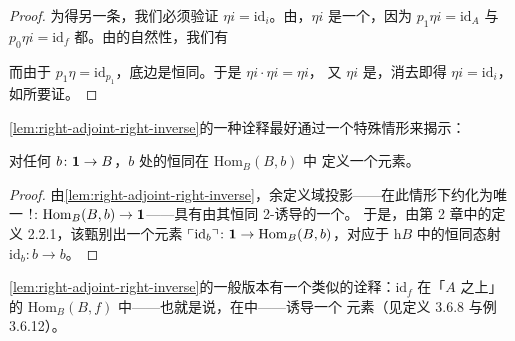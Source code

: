 \begin{proof}
为得另一条，我们必须验证 $\eta i=\mathrm{id}_i$。由\trTwoCellConservativity{}，$\eta i$ %
是一个\trIsomorphism{}，因为 $p_{1}\eta i=\mathrm{id}_A$ 与 $p_{0}\eta i=\mathrm{id}_f$ %
都\trInvertible{}。由\trWhiskering{}的自然性，我们有
\begin{center}
\end{center}
而由于 $p_{1}\eta=\mathrm{id}_{p_{1}}$，底边是恒同。于是 $\eta i\cdot\eta i=\eta i$，%
又 $\eta i$ 是\trIsomorphism{}，消去即得 $\eta i=\mathrm{id}_i$，如所要证。
\end{proof}

\cref{lem:right-adjoint-right-inverse}的一种诠释最好通过一个特殊情形来揭示：

\begin{corollary}\label{cor:terminal-element}
对任何\trElement{} $b\colon\mathbf{1}\to B$，$b$ 处的恒同在 $\mathrm{Hom}_B(B,b)$ 中%
定义一个\trTerminal{}元素。
\end{corollary}

\begin{proof}
由\cref{lem:right-adjoint-right-inverse}，余定义域投影——在此情形下约化为唯一\trFunctor{}%
$!\colon\mathrm{Hom}_B(B,b)\to\mathbf{1}$——具有由其恒同 2-\trCell{}诱导的一个\trRightAdjoint\trRightInverse{}。%
于是，由第 2 章中的定义 2.2.1，该\trRightAdjoint{}甄别出一个\trTerminal{}元素 %
$\ulcorner\mathrm{id}_b\urcorner\colon\mathbf{1}\to\mathrm{Hom}_B(B,b)$，对应于\trHomotopyCategory{}%
$\mathrm{h}B$ 中的恒同态射 $\mathrm{id}_b\colon b\to b$。
\end{proof}

\cref{lem:right-adjoint-right-inverse}的一般版本有一个类似的诠释：$\mathrm{id}_f$ %
在「$A$ 之上」的 $\mathrm{Hom}_B(B,f)$ 中——也就是说，在\trSliceInfinityCosmos{}中——诱导一个%
\trTerminal{}元素（见定义 3.6.8 与例 3.6.12）。

